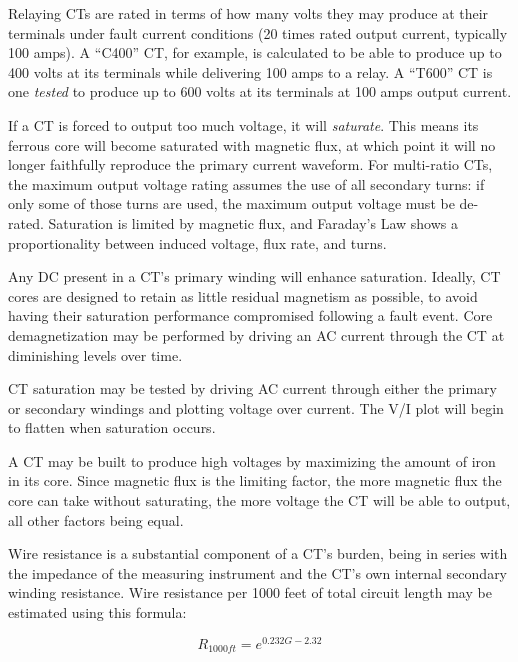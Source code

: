 Relaying CTs are rated in terms of how many volts they may produce at their terminals under fault current conditions (20 times rated output current, typically 100 amps).  A ``C400'' CT, for example, is calculated to be able to produce up to 400 volts at its terminals while delivering 100 amps to a relay.  A ``T600'' CT is one {\it tested} to produce up to 600 volts at its terminals at 100 amps output current.

\vskip 10pt

If a CT is forced to output too much voltage, it will {\it saturate}.  This means its ferrous core will become saturated with magnetic flux, at which point it will no longer faithfully reproduce the primary current waveform.  For multi-ratio CTs, the maximum output voltage rating assumes the use of all secondary turns: if only some of those turns are used, the maximum output voltage must be de-rated.  Saturation is limited by magnetic flux, and Faraday's Law shows a proportionality between induced voltage, flux rate, and turns.

\vskip 10pt

Any DC present in a CT's primary winding will enhance saturation.  Ideally, CT cores are designed to retain as little residual magnetism as possible, to avoid having their saturation performance compromised following a fault event.  Core demagnetization may be performed by driving an AC current through the CT at diminishing levels over time.

\vskip 10pt

CT saturation may be tested by driving AC current through either the primary or secondary windings and plotting voltage over current.  The V/I plot will begin to flatten when saturation occurs.

\vskip 10pt

A CT may be built to produce high voltages by maximizing the amount of iron in its core.  Since magnetic flux is the limiting factor, the more magnetic flux the core can take without saturating, the more voltage the CT will be able to output, all other factors being equal.

\vskip 10pt

Wire resistance is a substantial component of a CT's burden, being in series with the impedance of the measuring instrument and the CT's own internal secondary winding resistance.  Wire resistance per 1000 feet of total circuit length may be estimated using this formula:

$$R_{1000ft} = e^{0.232 G - 2.32}$$

